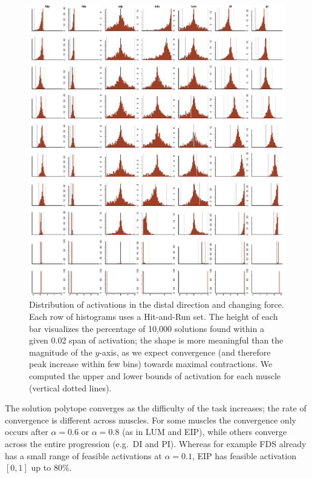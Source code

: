 \begin{figure}[htbp]
\centering
\includegraphics[width=\textwidth]{figs/Z_alphaProgression1430924065026.pdf}
\caption{Distribution of activations in the distal direction and changing force. Each row of histograms uses a Hit-and-Run set. The height of each bar visualizes the percentage of 10,000 solutions found within a given 0.02 span of activation; the shape is more meaningful than the magnitude of the $y$-axis, as we expect convergence (and therefore peak increase within few bins) towards maximal contractions. We computed the upper and lower bounds of activation for each muscle (vertical dotted lines).}
\label{fig:Z_progression}
\end{figure}

The solution polytope converges as the difficulty of the task increases; the rate of convergence is different across muscles.
For some muscles the convergence only occurs after $\alpha=0.6$ or $\alpha=0.8$ (as in LUM and EIP), while others converge across the entire progression (e.g.\ DI and PI).
Whereas for example FDS already has a small range of feasible activations at $\alpha=0.1$, EIP has feasible activation $[0,1]$ up to 80\%.

